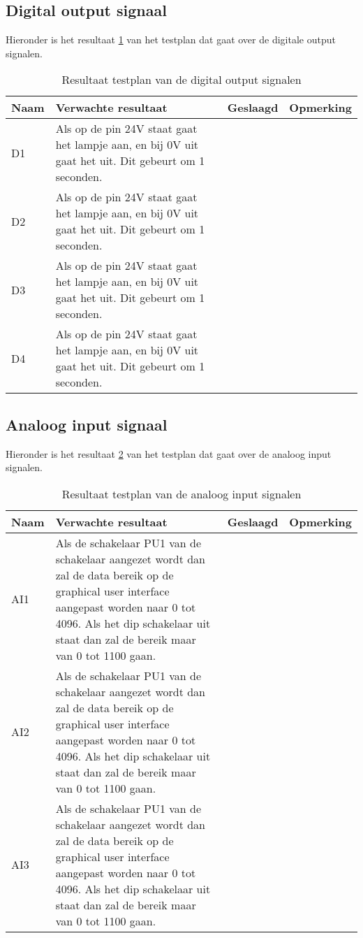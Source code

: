 \newpage
\subsection{Digital output signaal}
Hieronder is het resultaat \ref{tab:resultaatdio} van het testplan dat gaat over de digitale output signalen.
\begin{table}[h!]
	\centering
	\caption{Resultaat testplan van de digital output signalen}
	\begin{tabular}{lp{8.5cm}lp{4cm}}
	\toprule
	\textbf{Naam} 	& \textbf{Verwachte resultaat} & \textbf{Geslaagd} & \textbf{Opmerking} \\ \toprule
	D1	&	Als op de pin 24V staat gaat het lampje aan, en bij 0V uit gaat het uit. Dit gebeurt om 1 seconden. && \\			
	D2	&	Als op de pin 24V staat gaat het lampje aan, en bij 0V uit gaat het uit. Dit gebeurt om 1 seconden. && \\			
	D3	&	Als op de pin 24V staat gaat het lampje aan, en bij 0V uit gaat het uit. Dit gebeurt om 1 seconden. && \\			
	D4	&	Als op de pin 24V staat gaat het lampje aan, en bij 0V uit gaat het uit. Dit gebeurt om 1 seconden. && \\ \bottomrule
	\end{tabular}
	\label{tab:resultaatdio}
\end{table}

\subsection{Analoog input signaal}
Hieronder is het resultaat \ref{tab:resultaatai} van het testplan dat gaat over de analoog input signalen.
\begin{table}[h!]
	\caption{Resultaat testplan van de analoog input signalen}
	\begin{tabular}{lp{8.5cm}lp{4cm}}
	\toprule
	\textbf{Naam} 	& \textbf{Verwachte resultaat} & \textbf{Geslaagd} & \textbf{Opmerking}\\ \toprule
	AI1			& Als de schakelaar PU1 van de schakelaar aangezet wordt dan zal de data bereik op de graphical user interface aangepast worden naar 0 tot 4096. Als het dip schakelaar uit staat dan zal de bereik maar van 0 tot 1100 gaan.\\
	AI2			& Als de schakelaar PU1 van de schakelaar aangezet wordt dan zal de data bereik op de graphical user interface aangepast worden naar 0 tot 4096. Als het dip schakelaar uit staat dan zal de bereik maar van 0 tot 1100 gaan.\\
	AI3			& Als de schakelaar PU1 van de schakelaar aangezet wordt dan zal de data bereik op de graphical user interface aangepast worden naar 0 tot 4096. Als het dip schakelaar uit staat dan zal de bereik maar van 0 tot 1100 gaan.\\  \bottomrule
	\end{tabular}
	\label{tab:resultaatai}
\end{table}


